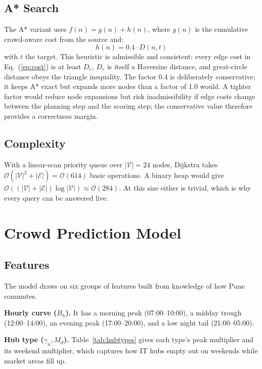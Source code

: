 \documentclass[conference]{IEEEtran}
\begin{document}
\subsection{A* Search}
The A* variant uses $f(n) = g(n) + h(n)$, where $g(n)$ is the cumulative crowd-aware cost from the source and:
\begin{equation}
h(n) = 0.4 \cdot D(n, t)
\label{eq:heuristic}
\end{equation}
with $t$ the target. This heuristic is admissible and consistent: every edge cost in Eq.~(\ref{eq:cost}) is at least $D_e$, $D_e$ is itself a Haversine distance, and great-circle distance obeys the triangle inequality. The factor 0.4 is deliberately conservative; it keeps A* exact but expands more nodes than a factor of 1.0 would. A tighter factor would reduce node expansions but risk inadmissibility if edge costs change between the planning step and the scoring step; the conservative value therefore provides a correctness margin.

\subsection{Complexity}
With a linear-scan priority queue over $|\mathcal{V}| = 24$ nodes, Dijkstra takes $\mathcal{O}(|\mathcal{V}|^2 + |\mathcal{E}|) = \mathcal{O}(614)$ basic operations. A binary heap would give $\mathcal{O}((|\mathcal{V}| + |\mathcal{E}|) \log |\mathcal{V}|) \approx \mathcal{O}(284)$. At this size either is trivial, which is why every query can be answered live.

\section{Crowd Prediction Model}

\subsection{Features}
The model draws on six groups of features built from knowledge of how Pune commutes.

\textbf{Hourly curve ($B_h$).} It has a morning peak (07:00--10:00), a midday trough (12:00--14:00), an evening peak (17:00--20:00), and a low night tail (21:00--05:00).

\textbf{Hub type ($\gamma_u, M_d$).} Table~\ref{tab:hubtypes} gives each type's peak multiplier and its weekend multiplier, which captures how IT hubs empty out on weekends while market areas fill up.
\end{document}

